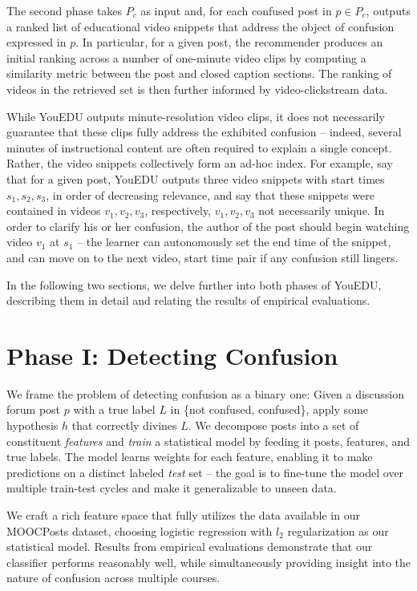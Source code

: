 \documentclass{edm_template}
\begin{document}
The second phase takes $P_{c}$ as input and, for each confused post in $p \in P_{c}$, outputs a ranked list of educational video snippets that address the object of confusion expressed in $p$. In particular, for a given post, the recommender produces an initial ranking across a number of one-minute video clips by computing a similarity metric between the post and closed caption sections. The ranking of videos in the retrieved set is then further informed by video-clickstream data.

While YouEDU outputs minute-resolution video clips, it does not necessarily guarantee that these clips fully address the exhibited confusion -- indeed, several minutes of instructional content are often required to explain a single concept. Rather, the video snippets collectively form an ad-hoc index. For example, say that for a given post, YouEDU outputs three video snippets with start times $s_{1}, s_{2}, s_{3}$, in order of decreasing relevance, and say that these snippets were contained in videos $v_{1}, v_{2}, v_{3}$, respectively, $v_{1}, v_{2}, v_{3}$ not necessarily unique. In order to clarify his or her confusion, the author of the post should begin watching video $v_{1}$ at $s_{1}$ -- the learner can autonomously set the end time of the snippet, and can move on to the next video, start time pair if any confusion still lingers. 

In the following two sections, we delve further into both phases of YouEDU, describing them in detail and relating the results of empirical evaluations.

\section{Phase I: Detecting Confusion}
We frame the problem of detecting confusion as a binary one: Given a discussion forum post $p$ with a true label $L$ in \{not confused, confused\}, apply some hypothesis $h$ that correctly divines $L$. We decompose posts into a set of constituent \emph{features} and \emph{train} a statistical model by feeding it posts, features, and true labels. The model learns weights for each feature, enabling it to make predictions on a distinct labeled \emph{test} set -- the goal is to fine-tune the model over multiple train-test cycles and make it generalizable to unseen data.

We craft a rich feature space that fully utilizes the data available in our MOOCPosts dataset, choosing logistic regression with $l_{2}$ regularization as our statistical model. Results from empirical evaluations demonstrate that our classifier performs reasonably well, while simultaneously providing insight into the nature of confusion across multiple courses.
\end{document}

